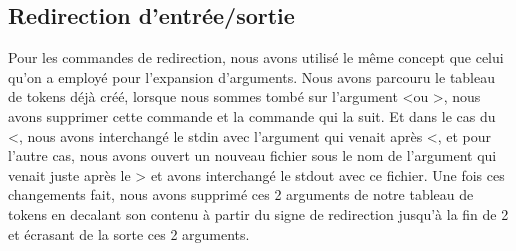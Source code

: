 \documentclass{article}
\begin{document}
\subsection{Redirection d'entrée/sortie}
Pour les commandes de redirection, nous avons utilisé le même concept que celui qu'on a employé pour l'expansion d'arguments. Nous avons parcouru le tableau de tokens déjà créé, lorsque nous sommes tombé sur l'argument \textless ou \textgreater, nous avons supprimer cette commande et la commande qui la suit. Et dans le cas du \textless, nous avons interchangé le stdin avec l'argument qui venait après \textless, et pour l'autre cas, nous avons ouvert un nouveau fichier sous le nom de l'argument qui venait  juste après le > et avons interchangé le stdout avec ce fichier. Une fois ces changements fait, nous avons supprimé ces 2 arguments de notre tableau de tokens en decalant son contenu à partir du signe de redirection jusqu'à la fin de 2 et écrasant de la sorte ces 2 arguments.
\end{document}
